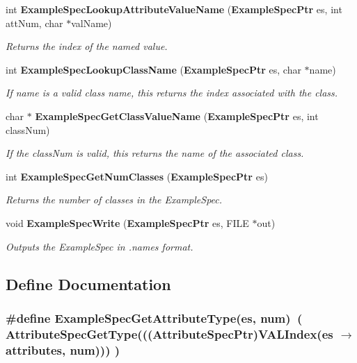 \begin{CompactItemize}
int {\bf Example\-Spec\-Lookup\-Attribute\-Value\-Name} ({\bf Example\-Spec\-Ptr} es, int att\-Num, char $\ast$val\-Name)
\begin{CompactList}\small\item\em Returns the index of the named value. \item\end{CompactList}\item 
int {\bf Example\-Spec\-Lookup\-Class\-Name} ({\bf Example\-Spec\-Ptr} es, char $\ast$name)
\begin{CompactList}\small\item\em If name is a valid class name, this returns the index associated with the class. \item\end{CompactList}\item 
char $\ast$ {\bf Example\-Spec\-Get\-Class\-Value\-Name} ({\bf Example\-Spec\-Ptr} es, int class\-Num)
\begin{CompactList}\small\item\em If the class\-Num is valid, this returns the name of the associated class. \item\end{CompactList}\item 
int {\bf Example\-Spec\-Get\-Num\-Classes} ({\bf Example\-Spec\-Ptr} es)
\begin{CompactList}\small\item\em Returns the number of classes in the Example\-Spec. \item\end{CompactList}\item 
void {\bf Example\-Spec\-Write} ({\bf Example\-Spec\-Ptr} es, FILE $\ast$out)
\begin{CompactList}\small\item\em Outputs the Example\-Spec in .names format. \item\end{CompactList}\end{CompactItemize}


\subsection{Define Documentation}
\subsubsection{\setlength{\rightskip}{0pt plus 5cm}\#define Example\-Spec\-Get\-Attribute\-Type(es, num)\ ( Attribute\-Spec\-Get\-Type(((Attribute\-Spec\-Ptr)VALIndex(es $\rightarrow$ attributes, num))) )}\label{ExampleSpec_8h_a3}


